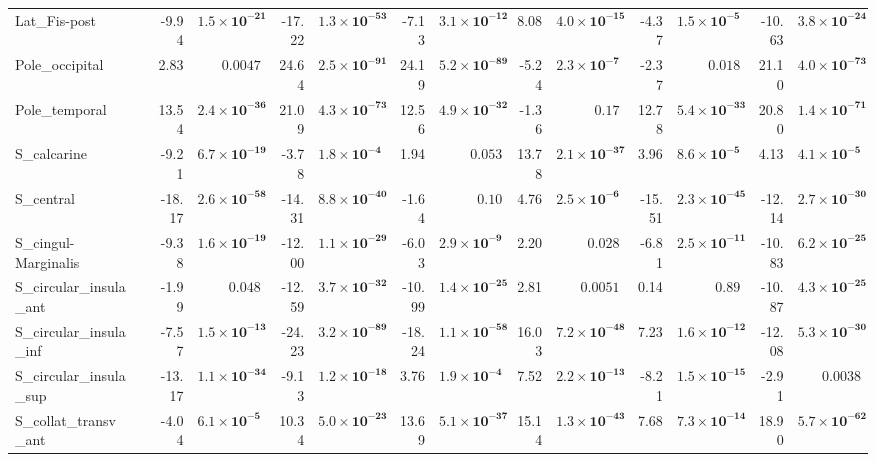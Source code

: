 {\begin{longtable}{llrrrrrrrrrrrr}
Lat\_Fis-post &  & -9.94 & $\mathbf{1.5{\times}10^{-21}}$ & -17.22 & $\mathbf{1.3{\times}10^{-53}}$ & -7.13 & $\mathbf{3.1{\times}10^{-12}}$ & 8.08 & $\mathbf{4.0{\times}10^{-15}}$ & -4.37 & $\mathbf{1.5{\times}10^{-5}}$ & -10.63 & $\mathbf{3.8{\times}10^{-24}}$ \\
Pole\_occipital &  & 2.83 & $0.0047$ & 24.64 & $\mathbf{2.5{\times}10^{-91}}$ & 24.19 & $\mathbf{5.2{\times}10^{-89}}$ & -5.24 & $\mathbf{2.3{\times}10^{-7}}$ & -2.37 & $0.018$ & 21.10 & $\mathbf{4.0{\times}10^{-73}}$ \\
Pole\_temporal &  & 13.54 & $\mathbf{2.4{\times}10^{-36}}$ & 21.09 & $\mathbf{4.3{\times}10^{-73}}$ & 12.56 & $\mathbf{4.9{\times}10^{-32}}$ & -1.36 & $0.17$ & 12.78 & $\mathbf{5.4{\times}10^{-33}}$ & 20.80 & $\mathbf{1.4{\times}10^{-71}}$ \\
S\_calcarine &  & -9.21 & $\mathbf{6.7{\times}10^{-19}}$ & -3.78 & $\mathbf{1.8{\times}10^{-4}}$ & 1.94 & $0.053$ & 13.78 & $\mathbf{2.1{\times}10^{-37}}$ & 3.96 & $\mathbf{8.6{\times}10^{-5}}$ & 4.13 & $\mathbf{4.1{\times}10^{-5}}$ \\
S\_central &  & -18.17 & $\mathbf{2.6{\times}10^{-58}}$ & -14.31 & $\mathbf{8.8{\times}10^{-40}}$ & -1.64 & $0.10$ & 4.76 & $\mathbf{2.5{\times}10^{-6}}$ & -15.51 & $\mathbf{2.3{\times}10^{-45}}$ & -12.14 & $\mathbf{2.7{\times}10^{-30}}$ \\
S\_cingul-Marginalis &  & -9.38 & $\mathbf{1.6{\times}10^{-19}}$ & -12.00 & $\mathbf{1.1{\times}10^{-29}}$ & -6.03 & $\mathbf{2.9{\times}10^{-9}}$ & 2.20 & $0.028$ & -6.81 & $\mathbf{2.5{\times}10^{-11}}$ & -10.83 & $\mathbf{6.2{\times}10^{-25}}$ \\
S\_circular\_insula\_ant &  & -1.99 & $0.048$ & -12.59 & $\mathbf{3.7{\times}10^{-32}}$ & -10.99 & $\mathbf{1.4{\times}10^{-25}}$ & 2.81 & $0.0051$ & 0.14 & $0.89$ & -10.87 & $\mathbf{4.3{\times}10^{-25}}$ \\
S\_circular\_insula\_inf &  & -7.57 & $\mathbf{1.5{\times}10^{-13}}$ & -24.23 & $\mathbf{3.2{\times}10^{-89}}$ & -18.24 & $\mathbf{1.1{\times}10^{-58}}$ & 16.03 & $\mathbf{7.2{\times}10^{-48}}$ & 7.23 & $\mathbf{1.6{\times}10^{-12}}$ & -12.08 & $\mathbf{5.3{\times}10^{-30}}$ \\
S\_circular\_insula\_sup &  & -13.17 & $\mathbf{1.1{\times}10^{-34}}$ & -9.13 & $\mathbf{1.2{\times}10^{-18}}$ & 3.76 & $\mathbf{1.9{\times}10^{-4}}$ & 7.52 & $\mathbf{2.2{\times}10^{-13}}$ & -8.21 & $\mathbf{1.5{\times}10^{-15}}$ & -2.91 & $0.0038$ \\
S\_collat\_transv\_ant &  & -4.04 & $\mathbf{6.1{\times}10^{-5}}$ & 10.34 & $\mathbf{5.0{\times}10^{-23}}$ & 13.69 & $\mathbf{5.1{\times}10^{-37}}$ & 15.14 & $\mathbf{1.3{\times}10^{-43}}$ & 7.68 & $\mathbf{7.3{\times}10^{-14}}$ & 18.90 & $\mathbf{5.7{\times}10^{-62}}$ \\

\end{longtable}}
